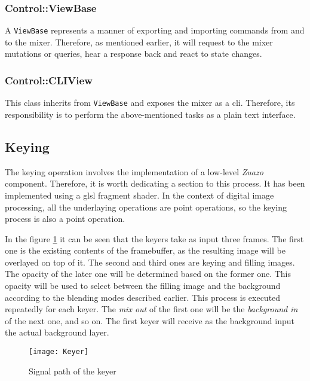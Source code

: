 \documentclass[../main.tex]{subfiles}
\begin{document}
\subsubsection{Control::ViewBase}
A \texttt{ViewBase} represents a manner of exporting and importing commands from and to the mixer. Therefore, as mentioned earlier, it will request to the mixer mutations or queries, hear a response back and react to state changes.

\subsubsection{Control::CLIView}
This class inherits from \texttt{ViewBase} and exposes the mixer as a \gls{cli}. Therefore, its responsibility is to perform the above-mentioned tasks as a plain text interface.

\subsection{Keying}
The keying operation involves the implementation of a low-level \textit{Zuazo} component. Therefore, it is worth dedicating a section to this process. It has been implemented using a \gls{glsl} fragment shader. In the context of digital image processing, all the underlaying operations are point operations, so the keying process is also a point operation.\newline

In the figure \ref{fig:04:keyer_block_digram} it can be seen that the keyers take as input three frames. The first one is the existing contents of the framebuffer, as the resulting image will be overlayed on top of it. The second and third ones are keying and filling images. The opacity of the later one will be determined based on the former one. This opacity will be used to select between the filling image and the background according to the blending modes described earlier. This process is executed repeatedly for each keyer. The \textit{mix out} of the first one will be the \textit{background in} of the next one, and so on. The first keyer will receive as the background input the actual background layer.\newline

\begin{figure}[htbp]
    \centering
    \texttt{[image: Keyer]}

    \caption{Signal path of the keyer}
    \label{fig:04:keyer_block_digram}
\end{figure}
\end{document}
